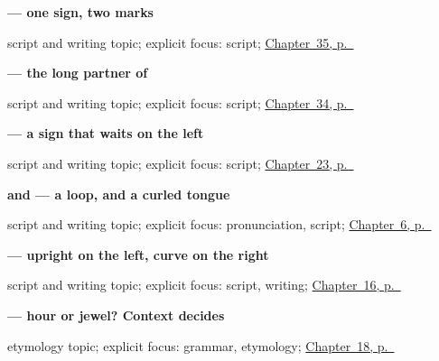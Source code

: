 \noindent\begin{minipage}[t]{\linewidth}
\raggedright
\textbf{ — one sign, two marks}\par
\footnotesize script and writing topic; explicit focus: script; \hyperref[ch:ta-arriving-at-a-house]{Chapter~35, p.~\pageref*{ch:ta-arriving-at-a-house}}
\end{minipage}\par\smallskip

\noindent\begin{minipage}[t]{\linewidth}
\raggedright
\textbf{ — the long partner of }\par
\footnotesize script and writing topic; explicit focus: script; \hyperref[ch:ta-verbs-between-people]{Chapter~34, p.~\pageref*{ch:ta-verbs-between-people}}
\end{minipage}\par\smallskip

\noindent\begin{minipage}[t]{\linewidth}
\raggedright
\textbf{ — a sign that waits on the left}\par
\footnotesize script and writing topic; explicit focus: script; \hyperref[ch:ta-day]{Chapter~23, p.~\pageref*{ch:ta-day}}
\end{minipage}\par\smallskip

\noindent\begin{minipage}[t]{\linewidth}
\raggedright
\textbf{ and  — a loop, and a curled tongue}\par
\footnotesize script and writing topic; explicit focus: pronunciation, script; \hyperref[ch:ta-dative-case]{Chapter~6, p.~\pageref*{ch:ta-dative-case}}
\end{minipage}\par\smallskip

\noindent\begin{minipage}[t]{\linewidth}
\raggedright
\textbf{ — upright on the left, curve on the right}\par
\footnotesize script and writing topic; explicit focus: script, writing; \hyperref[ch:ta-tamil-months]{Chapter~16, p.~\pageref*{ch:ta-tamil-months}}
\end{minipage}\par\smallskip

\noindent\begin{minipage}[t]{\linewidth}
\raggedright
\textbf{ — hour or jewel? Context decides}\par
\footnotesize etymology topic; explicit focus: grammar, etymology; \hyperref[ch:ta-telling-time]{Chapter~18, p.~\pageref*{ch:ta-telling-time}}
\end{minipage}\par\smallskip


